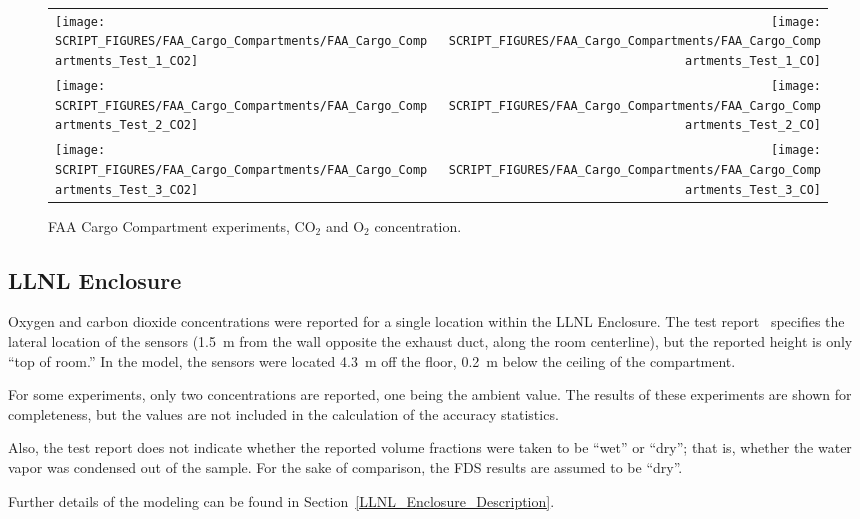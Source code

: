 \begin{figure}[h]
\begin{tabular*}{\textwidth}{l@{\extracolsep{\fill}}r}
\texttt{[image: SCRIPT\_FIGURES/FAA\_Cargo\_Compartments/FAA\_Cargo\_Compartments\_Test\_1\_CO2]} &
\texttt{[image: SCRIPT\_FIGURES/FAA\_Cargo\_Compartments/FAA\_Cargo\_Compartments\_Test\_1\_CO]} \\
\texttt{[image: SCRIPT\_FIGURES/FAA\_Cargo\_Compartments/FAA\_Cargo\_Compartments\_Test\_2\_CO2]} &
\texttt{[image: SCRIPT\_FIGURES/FAA\_Cargo\_Compartments/FAA\_Cargo\_Compartments\_Test\_2\_CO]} \\
\texttt{[image: SCRIPT\_FIGURES/FAA\_Cargo\_Compartments/FAA\_Cargo\_Compartments\_Test\_3\_CO2]} &
\texttt{[image: SCRIPT\_FIGURES/FAA\_Cargo\_Compartments/FAA\_Cargo\_Compartments\_Test\_3\_CO]}
\end{tabular*}
\caption[FAA Cargo Compartment experiments, CO$_2$ and O$_2$ concentration]{FAA Cargo Compartment experiments, CO$_2$ and O$_2$ concentration.}
\label{FAA_Cargo_CO2_CO}
\end{figure}

\clearpage

\subsection{LLNL Enclosure}

Oxygen and carbon dioxide concentrations were reported for a single location within the LLNL Enclosure. The test report~\cite{Foote:LLNL1986} specifies the lateral location of the sensors (1.5~m from the wall opposite the exhaust duct, along the room centerline), but the reported height is only ``top of room.'' In the model, the sensors were located 4.3~m off the floor, 0.2~m below the ceiling of the compartment.

For some experiments, only two concentrations are reported, one being the ambient value. The results of these experiments are shown for completeness, but the values are not included in the calculation of the accuracy statistics.

Also, the test report does not indicate whether the reported volume fractions were taken to be ``wet'' or ``dry''; that is, whether the water vapor was condensed out of the sample. For the sake of comparison, the FDS results are assumed to be ``dry''.

Further details of the modeling can be found in Section~\ref{LLNL_Enclosure_Description}.


